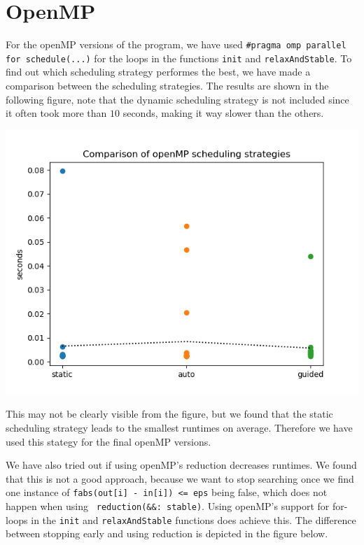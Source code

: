 \documentclass[a4paper]{article}
\begin{document}

\section{OpenMP}
For the openMP versions of the program, we have used \texttt{\#pragma omp parallel for schedule(...)} for the loops in the functions \texttt{init} and \texttt{relaxAndStable}. To find out which scheduling strategy performes the best, we have made a comparison between the scheduling strategies. The results are shown in the following figure, note that the dynamic scheduling strategy is not included since it often took more than $10$ seconds, making it way slower than the others.

\includegraphics[scale = 0.5]{../graphs/Comparison of openMP scheduling strategies.png}

This may not be clearly visible from the figure, but we found that the static scheduling strategy leads to the smallest runtimes on average. Therefore we have used this stategy for the final openMP versions.

We have also tried out if using openMP's reduction decreases runtimes. We found that this is not a good approach, because we want to stop searching once we find one instance of \texttt{fabs(out[i] - in[i]) <= eps} being false, which does not happen when using \texttt{ reduction(\&\&: stable)}. Using openMP's support for for-loops in the \texttt{init} and \texttt{relaxAndStable} functions does achieve this. The difference between stopping early and using reduction is depicted in the figure below.
\end{document}
